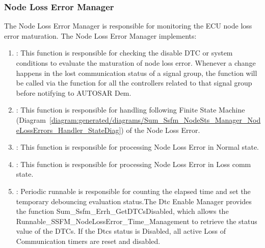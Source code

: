 \subsubsection{Node Loss Error Manager}
\label{subsec:NodeLossErrManager}
The Node Loss Error Manager is responsible for monitoring the ECU node loss error maturation. 
The Node Loss Error Manager implements:
\begin{enumerate}
    \item {}: This function is responsible for checking the disable DTC or system conditions to evaluate the maturation of node loss error. Whenever a change happens in the lost communication status of a signal group,
    the function  will be called via the function  for all the controllers related to that signal group before notifying to AUTOSAR Dem.
    \item {}: This function is responsible for handling following Finite State Machine (Diagram~\ref{diagram:generated/diagrams/Sum_Ssfm_NodeSts_Manager_NodeLossErrors_Handler_StateDiag}) of the Node Loss Error.
    \item {}: This function is responsible for processing Node Loss Error in Normal state.
    \item {}: This function is responsible for processing Node Loss Error in Loss comm state.
    \item {}: Periodic runnable is responsible for counting the elapsed time and set the temporary debouncing evaluation status.The Dtc Enable Manager provides the function Sum_Ssfm_Errh_GetDTCsDisabled, which allows the Runnable_SSFM_NodeLossError_Time_Management to retrieve the status value of the DTCs. If the Dtcs status is 
    Disabled, all active Loss of Communication timers are reset and disabled.
    
\end{enumerate} 

{   }


